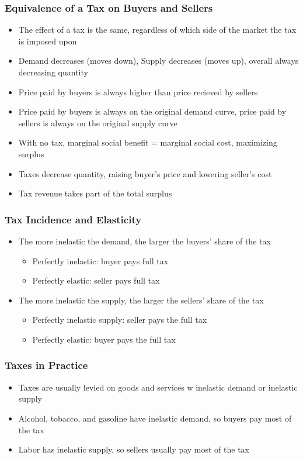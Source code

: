 \documentclass[11pt]{article}
\begin{document}
\subsubsection{Equivalence of a Tax on Buyers and Sellers}
\label{sec:org86cf9de}
\begin{itemize}
\item The effect of a tax is the same, regardless of which side of the market the tax is imposed upon
\item Demand decreases (moves down), Supply decreases (moves up), overall always decreasing quantity
\item Price paid by buyers is always higher than price recieved by sellers
\item Price paid by buyers is always on the original demand curve, price paid by sellers is 
always on the original supply curve
\item With no tax, marginal social benefit = marginal social cost, maximizing surplus
\item Taxes decrease quantity, raising buyer's price and lowering seller's cost
\item Tax revenue takes part of the total surplus
\end{itemize}
\subsubsection{Tax Incidence and Elasticity}
\label{sec:org4b03428}
\begin{itemize}
\item The more inelastic the demand, the larger the buyers' share of the tax
\begin{itemize}
\item Perfectly inelastic: buyer pays full tax
\item Perfectly elastic: seller pays full tax
\end{itemize}
\item The more inelastic the supply, the larger the sellers' share of the tax
\begin{itemize}
\item Perfectly inelastic supply: seller pays the full tax
\item Perfectly elastic: buyer pays the full tax
\end{itemize}
\end{itemize}
\subsubsection{Taxes in Practice}
\label{sec:org581caa2}
\begin{itemize}
\item Taxes are usually levied on goods and services w inelastic demand or inelastic supply
\item Alcohol, tobacco, and gasoline have inelastic demand, so buyers pay most of the tax
\item Labor has inelastic supply, so sellers usually pay most of the tax
\end{itemize}
\end{document}
